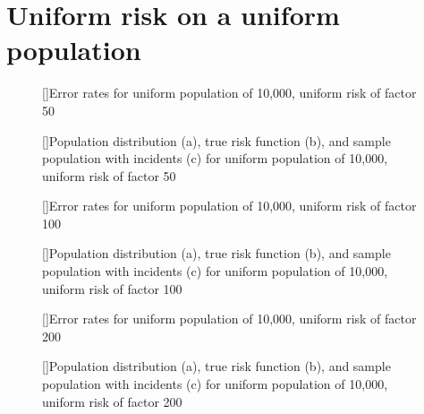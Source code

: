 

{\setlength{\parindent}{0pt}

\section{Uniform risk on a uniform population}
\label{sec:app:results_unif_unif}


\begin{figure}[!htb]
    
    []{Error rates for uniform population of 10,000, uniform risk of \gls{factor} 50}
    \label{tab:mean_error_rates:unif_50_unif}
    
    []{Population distribution (a), true risk function (b), and sample population with incidents (c) for uniform population of 10,000, uniform risk of \gls{factor} 50}
    \label{fig:distributions:unif_50_unif}    
\end{figure}


\begin{figure}[!htb]
    
    []{Error rates for uniform population of 10,000, uniform risk of \gls{factor} 100}
    \label{tab:mean_error_rates:unif_100_unif}
    
    []{Population distribution (a), true risk function (b), and sample population with incidents (c) for uniform population of 10,000, uniform risk of \gls{factor} 100}
    \label{fig:distributions:unif_100_unif}    
\end{figure}



\begin{figure}[!htb]
    
    []{Error rates for uniform population of 10,000, uniform risk of \gls{factor} 200}
    \label{tab:mean_error_rates:unif_200_unif}
    
    []{Population distribution (a), true risk function (b), and sample population with incidents (c) for uniform population of 10,000, uniform risk of \gls{factor} 200}
    \label{fig:distributions:unif_200_unif}    
\end{figure}


}
